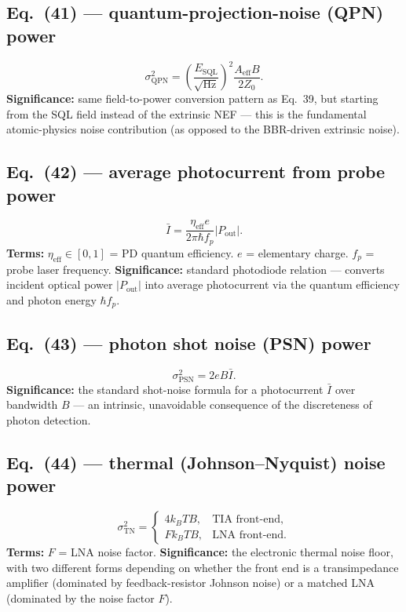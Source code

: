 \documentclass[11pt]{article}
\begin{document}
\subsection*{Eq.~(41) --- quantum-projection-noise (QPN) power}
\begin{equation}
\sigma_\text{QPN}^2 = \left(\frac{E_\text{SQL}}{\sqrt{\text{Hz}}}\right)^2\frac{A_\text{eff}B}{2Z_0}. \tag{41}
\end{equation}
\textbf{Significance:} same field-to-power conversion pattern as
Eq.~39, but starting from the SQL field instead of the extrinsic NEF ---
this is the fundamental atomic-physics noise contribution (as opposed
to the BBR-driven extrinsic noise).

\subsection*{Eq.~(42) --- average photocurrent from probe power}
\begin{equation}
\bar I = \frac{\eta_\text{eff}e}{2\pi\hbar f_p}|P_\text{out}|. \tag{42}
\end{equation}
\textbf{Terms:} $\eta_\text{eff}\in[0,1]$ = PD quantum efficiency.
$e$ = elementary charge. $f_p$ = probe laser frequency.
\textbf{Significance:} standard photodiode relation --- converts
incident optical power $|P_\text{out}|$ into average photocurrent via
the quantum efficiency and photon energy $\hbar f_p$.

\subsection*{Eq.~(43) --- photon shot noise (PSN) power}
\begin{equation}
\sigma_\text{PSN}^2 = 2eB\bar I. \tag{43}
\end{equation}
\textbf{Significance:} the standard shot-noise formula for a
photocurrent $\bar I$ over bandwidth $B$ --- an intrinsic, unavoidable
consequence of the discreteness of photon detection.

\subsection*{Eq.~(44) --- thermal (Johnson--Nyquist) noise power}
\begin{equation}
\sigma_\text{TN}^2 =
\begin{cases}
4k_BTB, & \text{TIA front-end},\\
Fk_BTB, & \text{LNA front-end}.
\end{cases} \tag{44}
\end{equation}
\textbf{Terms:} $F$ = LNA noise factor.
\textbf{Significance:} the electronic thermal noise floor, with two
different forms depending on whether the front end is a
transimpedance amplifier (dominated by feedback-resistor Johnson noise)
or a matched LNA (dominated by the noise factor $F$).
\end{document}
